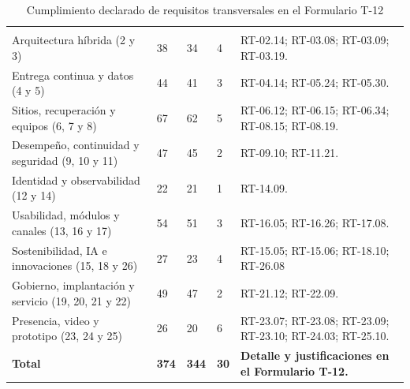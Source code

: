 \begin{longtable}{@{}L{.32\textwidth}
                    L{.08\textwidth}
                    L{.08\textwidth}
                    L{.08\textwidth}
                    L{.34\textwidth}@{}}
    \caption{Cumplimiento declarado de requisitos transversales
    en el Formulario T-12}
    \label{tab:cumplimiento-rt} \\
    \hline
     &
     &
     &
     &
     \\
    \hline
    \endfirsthead

    \hline
     &
     &
     &
     &
     \\
    \hline
    \endhead

    Arquitectura híbrida (2 y 3) &
    38 & 34 & 4 &
    RT-02.14; RT-03.08; RT-03.09; RT-03.19. \\
    \hline

    Entrega continua y datos (4 y 5) &
    44 & 41 & 3 &
    RT-04.14; RT-05.24; RT-05.30. \\
    \hline

    Sitios, recuperación y equipos (6, 7 y 8) &
    67 & 62 & 5 &
    RT-06.12; RT-06.15; RT-06.34;
    RT-08.15; RT-08.19. \\
    \hline

    Desempeño, continuidad y seguridad (9, 10 y 11) &
    47 & 45 & 2 &
    RT-09.10; RT-11.21. \\
    \hline

    Identidad y observabilidad (12 y 14) &
    22 & 21 & 1 &
    RT-14.09. \\
    \hline

    Usabilidad, módulos y canales (13, 16 y 17) &
    54 & 51 & 3 &
    RT-16.05; RT-16.26; RT-17.08. \\
    \hline

    Sostenibilidad, IA e innovaciones (15, 18 y 26) &
    27 & 23 & 4 &
    RT-15.05; RT-15.06; RT-18.10; RT-26.08 \\
    \hline

    Gobierno, implantación y servicio (19, 20, 21 y 22) &
    49 & 47 & 2 &
    RT-21.12; RT-22.09. \\
    \hline

    Presencia, video y prototipo (23, 24 y 25) &
    26 & 20 & 6 &
    RT-23.07; RT-23.08; RT-23.09; RT-23.10;
    RT-24.03; RT-25.10. \\
    \hline

    \textbf{Total} &
    \textbf{374} &
    \textbf{344} &
    \textbf{30} &
    \textbf{Detalle y justificaciones en el Formulario T-12.} \\
    \hline
\end{longtable}

